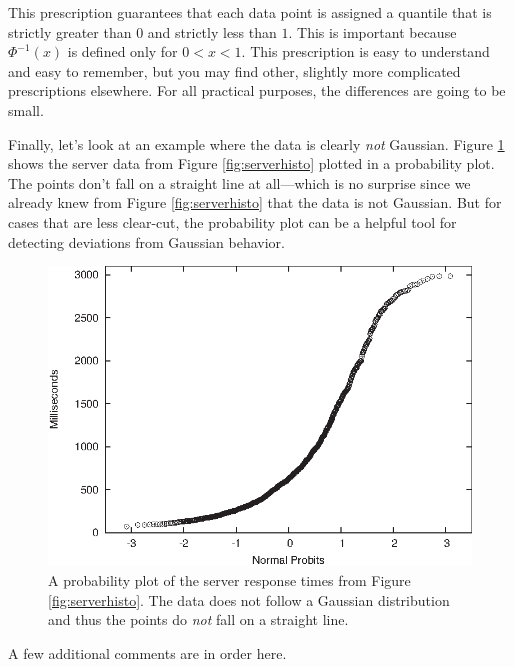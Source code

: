 This prescription guarantees that each data point is assigned a
quantile that is strictly greater than $0$ and strictly less than $1$.
This is important because $\Phi^{-1}(x)$ is defined only for $0 < x <
1$. This prescription is easy to understand and easy to remember, but
you may find other, slightly more complicated prescriptions elsewhere.
For all practical purposes, the differences are going to be small.

Finally, let's look at an example where the data is clearly \emph{not}
Gaussian. Figure \ref{fig:serverdataqq} shows the server data from
Figure \ref{fig:serverhisto} plotted in a probability plot.  The
points don't fall on a straight line at all---which is no surprise
since we already knew from Figure \ref{fig:serverhisto} that the data
is not Gaussian.  But for cases that are less clear-cut, the
probability plot can be a helpful tool for detecting deviations from
Gaussian behavior.

\begin{figure}
  \centerline{\includegraphics{img/serverdataqq}}
  \caption{A probability plot of the server response times from Figure
    \ref{fig:serverhisto}. The data does not follow a Gaussian
    distribution and thus the points do \emph{not} fall on a straight
    line.}
  \label{fig:serverdataqq}
\end{figure}

A few additional comments are in order here.

